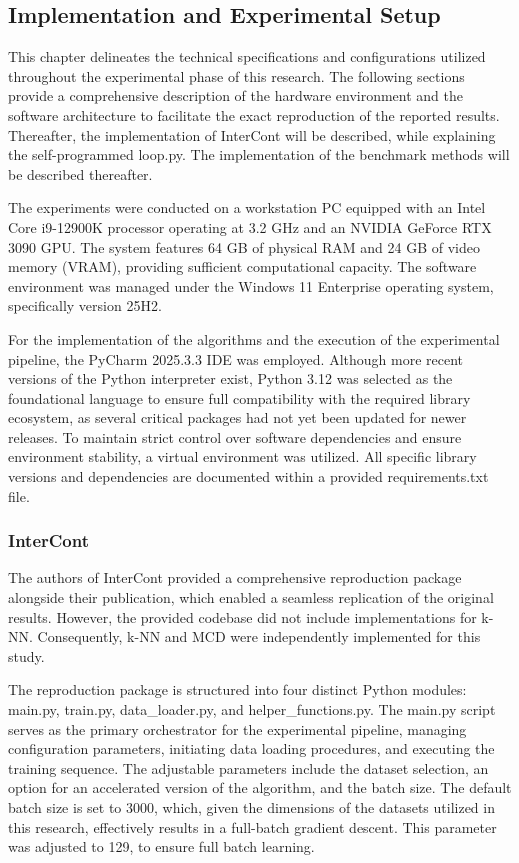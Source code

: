 \subsection{Implementation and Experimental Setup}\label{sec:setup}
This chapter delineates the technical specifications and configurations utilized throughout the experimental phase of this research.
The following sections provide a comprehensive description of the hardware environment and the software architecture to facilitate the exact reproduction of the reported results. 
Thereafter, the implementation of InterCont will be described, while explaining the self-programmed loop.py.
The implementation of the benchmark methods will be described thereafter.


The experiments were conducted on a workstation PC equipped with an Intel Core i9-12900K processor operating at 3.2 GHz and an NVIDIA GeForce RTX 3090 GPU. 
The system features 64 GB of physical RAM and 24 GB of video memory (VRAM), providing sufficient computational capacity. 
The software environment was managed under the Windows 11 Enterprise operating system, specifically version 25H2. 


For the implementation of the algorithms and the execution of the experimental pipeline, the PyCharm 2025.3.3 IDE was employed. 
Although more recent versions of the Python interpreter exist, Python 3.12 \citep{pythonpsf} was selected as the foundational language to ensure full compatibility with the required library ecosystem, as several critical packages had not yet been updated for newer releases. 
To maintain strict control over software dependencies and ensure environment stability, a virtual environment was utilized. 
All specific library versions and dependencies are documented within a provided requirements.txt file.


\subsubsection*{InterCont}
The authors of InterCont provided a comprehensive reproduction package alongside their publication, which enabled a seamless replication of the original results. 
However, the provided codebase did not include implementations for k-NN. 
Consequently, k-NN and MCD were independently implemented for this study. 


The reproduction package is structured into four distinct Python modules: main.py, train.py, data\_loader.py, and helper\_functions.py. 
The main.py script serves as the primary orchestrator for the experimental pipeline, managing configuration parameters, initiating data loading procedures, and executing the training sequence. 
The adjustable parameters include the dataset selection, an option for an accelerated version of the algorithm, and the batch size. 
The default batch size is set to 3000, which, given the dimensions of the datasets utilized in this research, effectively results in a full-batch gradient descent.
This parameter was adjusted to 129, to ensure full batch learning. 


